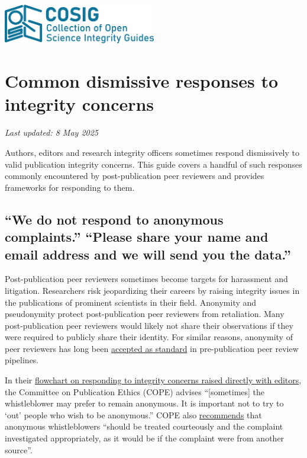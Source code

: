 \documentclass[letterpaper, 12pt]{article}
\begin{document}
\flushleft
\includegraphics[width=0.5\textwidth]{img/home/241017_final_logo_mockup.png}

\section*{Common dismissive responses to integrity concerns}
\textit{Last updated: 8 May 2025}

Authors, editors and research integrity officers sometimes respond dismissively to valid publication integrity concerns. This guide covers a handful of such responses commonly encountered by post-publication peer reviewers and provides frameworks for responding to them.

\subsection*{``We do not respond to anonymous complaints.''\newline 
``Please share your name and email address and we will send you the data.''}

Post-publication peer reviewers sometimes become targets for harassment and litigation. Researchers risk jeopardizing their careers by raising integrity issues in the publications of prominent scientists in their field. Anonymity and pseudonymity protect post-publication peer reviewers from retaliation. Many post-publication peer reviewers would likely not share their observations if they were required to publicly share their identity. For similar reasons, anonymity of peer reviewers has long been \href{https://doi.org/10.1038/6295}{accepted as standard} in pre-publication peer review pipelines. 

In their \href{https://doi.org/10.24318/cope.2019.2.25}{flowchart on responding to integrity concerns raised directly with editors}, the Committee on Publication Ethics (COPE) advises ``[sometimes] the whistleblower may prefer
to remain anonymous. It is important not to try to `out' people who wish to be anonymous.'' COPE also \href{https://doi.org/10.24318/Z9gtPzCa}{recommends} that anonymous whistleblowers ``should be treated courteously and the complaint investigated appropriately, as it would be if the complaint were from another source''.
\end{document}
